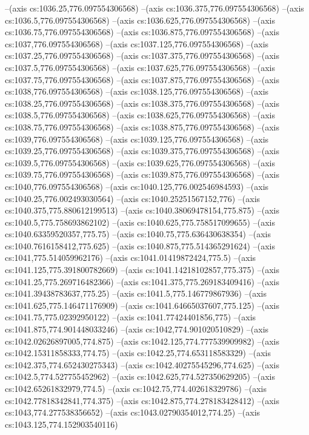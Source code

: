 --(axis cs:1036.25,776.097554306568)
--(axis cs:1036.375,776.097554306568)
--(axis cs:1036.5,776.097554306568)
--(axis cs:1036.625,776.097554306568)
--(axis cs:1036.75,776.097554306568)
--(axis cs:1036.875,776.097554306568)
--(axis cs:1037,776.097554306568)
--(axis cs:1037.125,776.097554306568)
--(axis cs:1037.25,776.097554306568)
--(axis cs:1037.375,776.097554306568)
--(axis cs:1037.5,776.097554306568)
--(axis cs:1037.625,776.097554306568)
--(axis cs:1037.75,776.097554306568)
--(axis cs:1037.875,776.097554306568)
--(axis cs:1038,776.097554306568)
--(axis cs:1038.125,776.097554306568)
--(axis cs:1038.25,776.097554306568)
--(axis cs:1038.375,776.097554306568)
--(axis cs:1038.5,776.097554306568)
--(axis cs:1038.625,776.097554306568)
--(axis cs:1038.75,776.097554306568)
--(axis cs:1038.875,776.097554306568)
--(axis cs:1039,776.097554306568)
--(axis cs:1039.125,776.097554306568)
--(axis cs:1039.25,776.097554306568)
--(axis cs:1039.375,776.097554306568)
--(axis cs:1039.5,776.097554306568)
--(axis cs:1039.625,776.097554306568)
--(axis cs:1039.75,776.097554306568)
--(axis cs:1039.875,776.097554306568)
--(axis cs:1040,776.097554306568)
--(axis cs:1040.125,776.002546984593)
--(axis cs:1040.25,776.002493030564)
--(axis cs:1040.25251567152,776)
--(axis cs:1040.375,775.880612199513)
--(axis cs:1040.38069478154,775.875)
--(axis cs:1040.5,775.758693862102)
--(axis cs:1040.625,775.758517099655)
--(axis cs:1040.63359520357,775.75)
--(axis cs:1040.75,775.636430638354)
--(axis cs:1040.7616158412,775.625)
--(axis cs:1040.875,775.514365291624)
--(axis cs:1041,775.514059962176)
--(axis cs:1041.01419872424,775.5)
--(axis cs:1041.125,775.391800782669)
--(axis cs:1041.14218102857,775.375)
--(axis cs:1041.25,775.269716482366)
--(axis cs:1041.375,775.269183409416)
--(axis cs:1041.39438783637,775.25)
--(axis cs:1041.5,775.146779867936)
--(axis cs:1041.625,775.146471176909)
--(axis cs:1041.64665037607,775.125)
--(axis cs:1041.75,775.02392950122)
--(axis cs:1041.77424401856,775)
--(axis cs:1041.875,774.901448033246)
--(axis cs:1042,774.901020510829)
--(axis cs:1042.02626897005,774.875)
--(axis cs:1042.125,774.777539909982)
--(axis cs:1042.15311858333,774.75)
--(axis cs:1042.25,774.653118583329)
--(axis cs:1042.375,774.652430275343)
--(axis cs:1042.40275545296,774.625)
--(axis cs:1042.5,774.527755452962)
--(axis cs:1042.625,774.527350629205)
--(axis cs:1042.65261832979,774.5)
--(axis cs:1042.75,774.402618329786)
--(axis cs:1042.77818342841,774.375)
--(axis cs:1042.875,774.278183428412)
--(axis cs:1043,774.277538356652)
--(axis cs:1043.02790354012,774.25)
--(axis cs:1043.125,774.152903540116)
